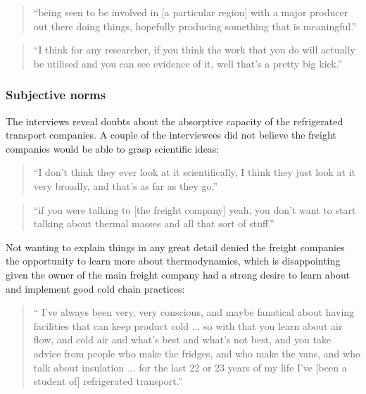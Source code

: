 \begin{quote}
\small
\enquote{being seen to be involved in [a particular region] with a major producer out there doing things, hopefully producing something that is meaningful.} \\
\end{quote}

\begin{quote}
\small
\enquote{I think for any researcher, if you think the work that you do will actually be utilised and you can see evidence of it, well that’s a pretty big kick.} \\
\end{quote}

\subsubsection{Subjective norms}

The interviews reveal doubts about the absorptive capacity of the refrigerated transport companies. A couple of the interviewees did not believe the freight companies would be able to grasp scientific ideas:

\begin{quote}
\small
\enquote{I don't think they ever look at it scientifically, I think they just look at it very broadly, and that's as far as they go.} \\
\end{quote}

\begin{quote}
\small
\enquote{if you were talking to [the freight company] yeah, you don't want to start talking about thermal masses and all that sort of stuff.} \\
\end{quote}

Not wanting to explain things in any great detail denied the freight companies the opportunity to learn more about thermodynamics, which is disappointing given the owner of the main freight company had a strong desire to learn about and implement good cold chain practices:

\begin{quote}
\small
\enquote{ I've always been very, very conscious, and maybe fanatical about having facilities that can keep product cold ... so with that you learn about air flow, and cold air and what's best and what’s not best, and you take advice from people who make the fridges, and who make the vans, and who talk about insulation ... for the last 22 or 23 years of my life I've [been a student of] refrigerated transport.} \\
\end{quote}

